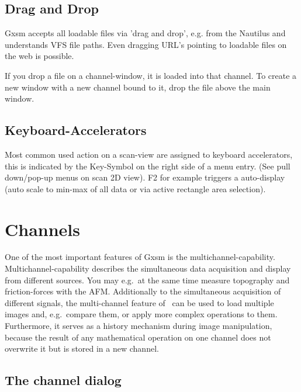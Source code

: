 \section{Drag and Drop}
\label{sec:main:DnD}

Gxsm accepts all loadable files via 'drag and drop', e.g. from the Nautilus and understands VFS file paths.  Even
dragging URL's pointing to loadable files on the web is possible.

If you drop a file on a channel-window, it is loaded into that channel. To create a new window with a new channel bound to it, drop the file above the main window.

\section{Keyboard-Accelerators}
\label{sec:main:accel}

Most common used action on a scan-view are assigned to keyboard accelerators, this is indicated by the Key-Symbol on the right side of a menu entry. (See pull down/pop-up menus on scan 2D view). F2 for example triggers a auto-display (auto scale to min-max of all data or via active rectangle area selection).


\chapter{Channels}
\label{ch:channels}

One of the most important features of Gxsm is the
multichannel-capability.  Multichannel-capability describes the simultaneous data acquisition
and display from different sources. You may e.g.\  at the same time
measure topography and friction-forces with the AFM.  Additionally to the
simultaneous acquisition of different signals, the multi-channel feature of
\Gxsm\ can be used to load multiple images and, e.g.\ compare them, or apply
more complex operations to them.  Furthermore, it serves as a history
mechanism during image manipulation, because the result of any mathematical
operation on one channel does not overwrite it but is stored in a new channel.


\section{The channel dialog}
\label{sec:channels:dialog}

